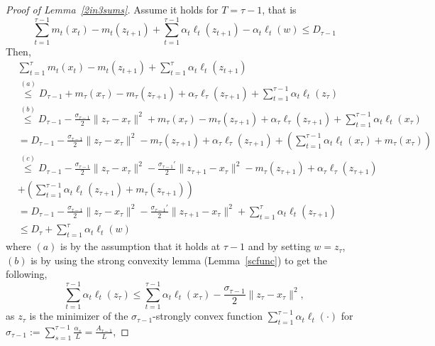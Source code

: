 \documentclass[final,12pt]{colt2018} %
\begin{document}
\begin{proof}[Proof of Lemma~\ref{2in3sums}]
Assume it holds for $T = \tau-1$, that is
\begin{equation}
 \sum_{t=1}^{\tau-1} m_t(x_t) - m_t(z_{t+1}) + \sum_{t=1}^{\tau-1} \alpha_t \ell_t(z_{t+1}) - \alpha_t \ell_t(w)
 \leq D_{\tau-1}
\end{equation}
Then,
\begin{equation}
\begin{aligned}
& \sum_{t=1}^{\tau} m_t(x_t) - m_t(z_{t+1}) + \sum_{t=1}^\tau \alpha_t \ell_t(z_{t+1}) 
\\ & \overset{(a)}{\leq} D_{\tau-1} + m_\tau(x_\tau) - m_\tau(z_{\tau+1})  + \alpha_\tau \ell_\tau(z_{\tau+1}) + \sum_{t=1}^{\tau-1}\alpha_t \ell_t (z_\tau) 
\\ & \overset{(b)}{\leq} D_{\tau-1} - \frac{\sigma_{\tau-1}}{2} \| z_\tau - x_\tau\|^2 + m_\tau(x_\tau) - m_\tau(z_{\tau+1})  + \alpha_\tau \ell_\tau(z_{\tau+1}) + \sum_{t=1}^{\tau-1}\alpha_t \ell_t (x_\tau) 
\\ & = D_{\tau-1} - \frac{\sigma_{\tau-1}}{2} \| z_\tau - x_\tau\|^2  - m_\tau(z_{\tau+1})  + \alpha_\tau \ell_\tau(z_{\tau+1}) + ( \sum_{t=1}^{\tau-1}\alpha_t \ell_t (x_\tau) + m_\tau(x_\tau) )
\\ & \overset{(c)}{\leq} D_{\tau-1} - \frac{\sigma_{\tau-1}}{2} \| z_\tau - x_\tau\|^2 
- \frac{\sigma_{\tau-1}'}{2} \| z_{\tau+1} - x_\tau\|^2 
 - m_\tau(z_{\tau+1})  + \alpha_\tau \ell_\tau(z_{\tau+1}) \\& + ( \sum_{t=1}^{\tau-1}\alpha_t \ell_t (z_{\tau+1}) + m_\tau(z_{\tau+1} ))
\\ &  = D_{\tau-1} - \frac{\sigma_{\tau-1}}{2} \| z_\tau - x_\tau\|^2 
- \frac{\sigma_{\tau-1}'}{2} \| z_{\tau+1} - x_\tau\|^2 
  + \sum_{t=1}^{\tau}\alpha_t \ell_t (z_{\tau+1}) 
\\ & \leq D_\tau + \sum_{t=1}^{\tau}\alpha_t \ell_t (w)
\end{aligned}
\end{equation}
where $(a)$ is by the assumption that it holds at $\tau-1$ and by setting $w=z_{\tau}$,
$(b)$ is by using the strong convexity lemma (Lemma~\ref{scfunc}) to get the following,
\begin{equation}
 \sum_{t=1}^{\tau-1}\alpha_t \ell_t (z_\tau) \leq  \sum_{t=1}^{\tau-1}\alpha_t \ell_t (x_\tau) - \frac{\sigma_{\tau-1}}{2} \| z_\tau - x_\tau\|^2,
\end{equation}
as $z_\tau$ is the minimizer of the $\sigma_{\tau-1}$-strongly convex function
$\sum_{t=1}^{\tau-1}\alpha_t \ell_t (\cdot) $ for $\sigma_{\tau-1} := \sum_{s=1}^{\tau-1}\frac{\alpha_s}{L} = \frac{A_{\tau-1}}{L}$,

\end{proof}
\end{document}
